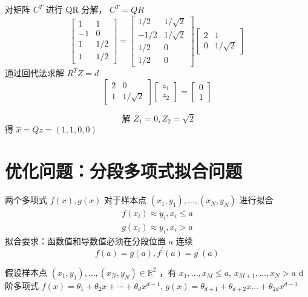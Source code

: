 对矩阵 $ C^{T} $ 进行 $ \mathrm{QR} $ 分解， $ C^{T}=Q R $
$$
\left[\begin{array}{cc}
1 & 1 \\
-1 & 0 \\
1 & 1 / 2 \\
1 & 1 / 2
\end{array}\right]=\left[\begin{array}{cc}
1 / 2 & 1 / \sqrt{2} \\
-1 / 2 & 1 / \sqrt{2} \\
1 / 2 & 0 \\
1 / 2 & 0
\end{array}\right]\left[\begin{array}{cc}
2 & 1 \\
0 & 1 / \sqrt{2}
\end{array}\right]
$$
通过回代法求解 $ R^{T} Z=d $
$$
\left[\begin{array}{cc}
2 & 0 \\
1 & 1 / \sqrt{2}
\end{array}\right]\left[\begin{array}{l}
z_{1} \\
z_{2}
\end{array}\right]=\left[\begin{array}{l}
0 \\
1
\end{array}\right]
$$


$$
\text { 解 } Z_{1}=0, Z_{2}=\sqrt{2}
$$
得 $ \hat{x}=Q z=(1,1,0,0) $


\section{优化问题：分段多项式拟合问题}

两个多项式 $ f(x), g(x) $ 对于样本点 $ \left(x_{1}, y_{1}\right), \ldots,\left(x_{N}, y_{N}\right) $ 进行拟合
$$
\begin{array}{l}
f\left(x_{i}\right) \approx y_{i}, x_{i} \leq a \\
g\left(x_{i}\right) \approx y_{i}, x_{i}>a
\end{array}
$$
拟合要求：函数值和导数值必须在分段位置 $ a $ 连续
$$
f(a)=g(a), f^{\prime}(a)=g^{\prime}(a)
$$

假设样本点 $ \left(x_{1}, y_{1}\right), \ldots,\left(x_{N}, y_{N}\right) \in \mathbb{R}^{2} $ ，有 $ x_{1}, \ldots, x_{M} \leq a $, $ x_{M+1}, \ldots, x_{N}>a $
$ \mathrm{d} $ 阶多项式 $ f(x)=\theta_{1}+\theta_{2} x+\cdots+\theta_{d} x^{d-1} $, $ g(x)=\theta_{d+1}+\theta_{d+2} x \ldots+\theta_{2 d} x^{d-1} $

